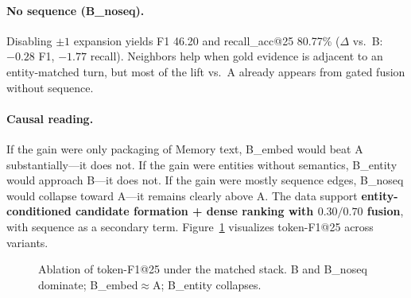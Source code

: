 \documentclass[11pt]{article}
\begin{document}
\paragraph{No sequence (B\_noseq).}
Disabling $\pm 1$ expansion yields F1 46.20 and recall\_acc@25 80.77\% ($\Delta$ vs.\ B: $-0.28$ F1, $-1.77$ recall).
Neighbors help when gold evidence is adjacent to an entity-matched turn, but most of the lift vs.\ A already appears from gated fusion without sequence.

\paragraph{Causal reading.}
If the gain were only packaging of Memory text, B\_embed would beat A substantially---it does not.
If the gain were entities without semantics, B\_entity would approach B---it does not.
If the gain were mostly sequence edges, B\_noseq would collapse toward A---it remains clearly above A.
The data support \textbf{entity-conditioned candidate formation + dense ranking with $0.30/0.70$ fusion}, with sequence as a secondary term.
Figure~\ref{fig:ablation} visualizes token-F1@25 across variants.

\begin{figure}[t]
\centering
{}
\caption{Ablation of token-F1@25 under the matched stack.
B and B\_noseq dominate; B\_embed$\approx$A; B\_entity collapses.}
\label{fig:ablation}
\end{figure}
\end{document}
